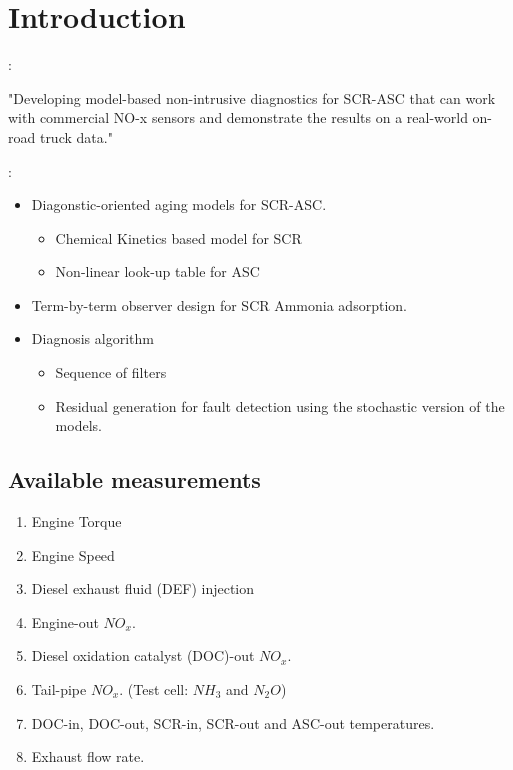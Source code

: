 \section{Introduction}

:

"Developing model-based non-intrusive diagnostics for SCR-ASC that can work with commercial NO-x sensors and demonstrate the results on a real-world on-road truck data."

\bigskip

:
\begin{itemize}
    \item Diagonstic-oriented aging models for SCR-ASC.
    \begin{itemize}
        \item Chemical Kinetics based model for SCR
        \item Non-linear look-up table for ASC
    \end{itemize}
    \item Term-by-term observer design for SCR Ammonia adsorption.
    \item Diagnosis algorithm
    \begin{itemize}
        \item Sequence of filters
        \item Residual generation for fault detection using the stochastic version of the models.
    \end{itemize}
\end{itemize}

\subsection{Available measurements}
\begin{enumerate}
    \item Engine Torque
    \item Engine Speed
    \item Diesel exhaust fluid (DEF) injection
    \item Engine-out $NO_x$.
    \item Diesel oxidation catalyst (DOC)-out $NO_x$.
    \item Tail-pipe $NO_x$. (Test cell: $NH_3$ and $N_2O$)
    \item DOC-in, DOC-out, SCR-in, SCR-out and ASC-out temperatures.
    \item Exhaust flow rate.
\end{enumerate}

